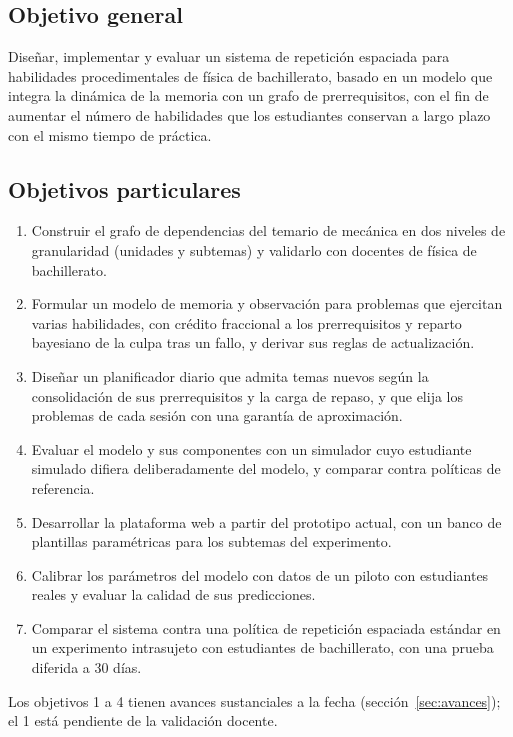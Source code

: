 \documentclass[12pt]{article}
\theoremstyle{definition}
\begin{document}
\subsection{Objetivo general}

Diseñar, implementar y evaluar un sistema de repetición espaciada para habilidades procedimentales de física de bachillerato, basado en un modelo que integra la dinámica de la memoria con un grafo de prerrequisitos, con el fin de aumentar el número de habilidades que los estudiantes conservan a largo plazo con el mismo tiempo de práctica.

\subsection{Objetivos particulares}

\begin{enumerate}
\item Construir el grafo de dependencias del temario de mecánica en dos niveles de granularidad (unidades y subtemas) y validarlo con docentes de física de bachillerato.
\item Formular un modelo de memoria y observación para problemas que ejercitan varias habilidades, con crédito fraccional a los prerrequisitos y reparto bayesiano de la culpa tras un fallo, y derivar sus reglas de actualización.
\item Diseñar un planificador diario que admita temas nuevos según la consolidación de sus prerrequisitos y la carga de repaso, y que elija los problemas de cada sesión con una garantía de aproximación.
\item Evaluar el modelo y sus componentes con un simulador cuyo estudiante simulado difiera deliberadamente del modelo, y comparar contra políticas de referencia.
\item Desarrollar la plataforma web a partir del prototipo actual, con un banco de plantillas paramétricas para los subtemas del experimento.
\item Calibrar los parámetros del modelo con datos de un piloto con estudiantes reales y evaluar la calidad de sus predicciones.
\item Comparar el sistema contra una política de repetición espaciada estándar en un experimento intrasujeto con estudiantes de bachillerato, con una prueba diferida a 30 días.
\end{enumerate}

Los objetivos 1 a 4 tienen avances sustanciales a la fecha (sección~\ref{sec:avances}); el 1 está pendiente de la validación docente.
\end{document}
